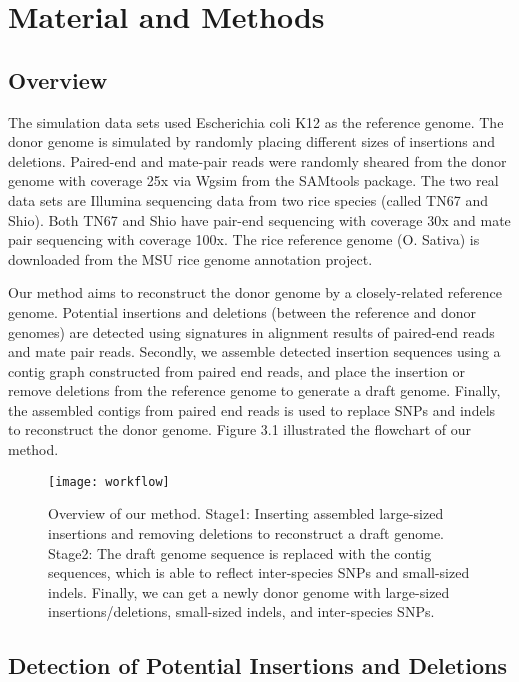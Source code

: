 \graphicspath{ {Chapters/images/} }
\chapter{Material and Methods}
\section{Overview}

The simulation data sets used Escherichia coli K12 as the reference genome. The donor genome is simulated by randomly placing different sizes of insertions and deletions. Paired-end and mate-pair reads were randomly sheared from the donor genome with coverage 25x via Wgsim from the SAMtools package. The two real data sets are Illumina sequencing data from two rice species (called TN67 and Shio). Both TN67 and Shio have pair-end sequencing with coverage 30x and mate pair sequencing with coverage 100x. The rice reference genome (O. Sativa) is downloaded from the MSU rice genome annotation project.

Our method aims to reconstruct the donor genome by a closely-related reference genome. Potential insertions and deletions (between the reference and donor genomes) are detected using signatures in alignment results of paired-end reads and mate pair reads. Secondly, we assemble detected insertion sequences using a contig graph constructed from paired end reads, and place the insertion or remove deletions from the reference genome to generate a draft genome. Finally, the assembled contigs from paired end reads is used to replace SNPs and indels to reconstruct the donor genome. Figure 3.1 illustrated the flowchart of our method.

\begin{figure}[ht]
\begin{center}
\texttt{[image: workflow]}
\caption{Overview of our method. Stage1: Inserting assembled large-sized insertions and removing deletions to reconstruct a draft genome. Stage2: The draft genome sequence is replaced with the contig sequences, which is able to reflect inter-species SNPs and small-sized indels. Finally, we can get a newly donor genome with large-sized insertions/deletions, small-sized indels, and inter-species SNPs.   }
\label{}
\end{center}
\end{figure}

\newpage
\section{Detection of Potential Insertions and Deletions}

